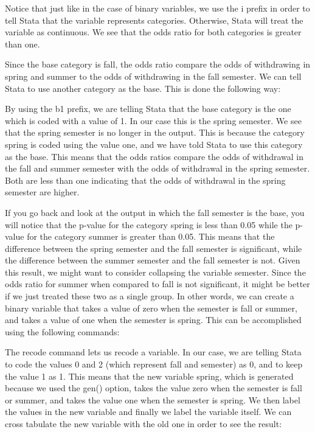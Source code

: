 \documentclass[a4paper,12pt,oneside]{book}
\begin{document}
\begin{stlog}\end{stlog}

Notice that just like in the case of binary variables, we use the i prefix in order to tell Stata that the variable represents categories. Otherwise, Stata will treat the variable as continuous. 
We see that the odds ratio for both categories is greater than one.

Since the base category is fall, the odds ratio compare the odds of withdrawing in spring and summer to the odds of withdrawing in the fall semester. We can tell Stata to use another category as the base. 
This is done the following way:

\begin{stlog}\end{stlog}

By using the b1 prefix, we are telling Stata that the base category is the one which is coded with a value of 1. In our case this is the spring semester. We see that the spring semester is no longer in the output. 
This is because the category spring is coded using the value one, and we have told Stata to use this category as the base. This means that the odds ratios compare the odds of withdrawal in the fall and summer 
semester with the odds of withdrawal in the spring semester. Both are less than one indicating that the odds of withdrawal in the spring semester are higher.

If you go back and look at the output in which the fall semester is the base, you will notice that the p-value for the category spring is less than 0.05 while the p-value for the category summer 
is greater than 0.05. This means that the difference between the spring semester and the fall semester is significant, while the difference between the summer semester and the fall semester is not. Given this 
result, we might want to consider collapsing the variable semester. Since the odds ratio for summer when compared to fall is not significant, it might be better if we just treated these two as a single group. 
In other words, we can create a binary variable that takes a value of zero when the semester is fall or summer, and takes a value of one when the semester is spring. This can be accomplished using the following commands:

\begin{stlog}\end{stlog}

The recode command lets us recode a variable. In our case, we are telling Stata to code the values 0 and 2 (which represent fall and semester) as 0, and to keep the value 1 as 1. 
This means that the new variable spring, which is generated because we used the gen() option, takes the value zero when the semester is fall or summer, and takes the value one when the semester 
is spring. We then label the values in the new variable and finally we label the variable itself. We can cross tabulate the new variable with the old one in order to see the result:
\end{document}
